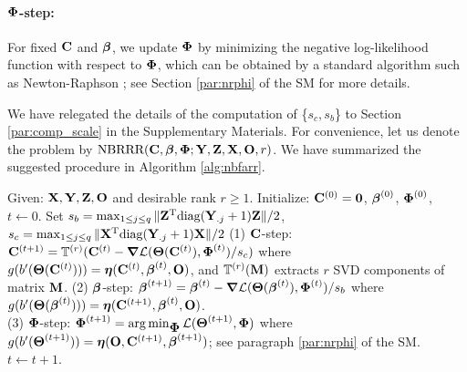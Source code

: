 \documentclass[12pt]{article}
\def\trans{^{\rm T}}
\newcommand{\bbL}{\mathcal{L}}
\newcommand{\bs}{\boldsymbol}
\newcommand{\cb}{\color{blue}}
\begin{document}
\paragraph{$\mbox{\boldmath $\Phi$}$-step:}\label{par:phi}
For fixed ${\bf C}$ and $\mbox{\boldmath $\beta$}$, we update $\mbox{\boldmath $\Phi$}$ by minimizing the negative log-likelihood function with respect to $\mbox{\boldmath $\Phi$}$, which can be obtained by a standard algorithm such as Newton-Raphson \citep{citer2019}; see Section \ref{par:nrphi} of the SM for more details. 


We have relegated the details of the  computation of \{$s_c,s_b$\} to Section \ref{par:comp_scale} in the Supplementary Materials.   
For convenience, let us denote the problem by $\mbox{NBRRR}({\bf C},\mbox{\boldmath $\beta$},\mbox{\boldmath $\Phi$}; {\bf Y}, {\bf Z}, {\bf X},{\bf O},r)$. We have summarized the suggested procedure in  Algorithm \ref{alg:nbfarr}. 


\begin{algorithm}[!]
	\caption{$\M{NBRRR}(\C,\bbeta,\bPhi; \W, \Z,\X,\bO,r)$}
	\begin{algorithmic}\label{alg:nbfarr}
	\STATE Given: ${\bf X}, {\bf Y}, {\bf Z}, {\bf O}$ and desirable rank $r\geq 1$.
	\STATE Initialize: ${\bf C}^{(0)} = {\bf 0}$, $\mbox{\boldmath $\beta$}^{(0)}$, $\mbox{\boldmath $\Phi$}^{(0)}$, $t \gets 0$. 
\STATE Set $s_b= \max_{1\leq j \leq q}  \|\Z\trans\M{diag}(\Y_{.j}+1)\Z \|/2$, $s_c = \max_{1\leq j \leq q}  \|\X\trans\M{diag}(\Y_{.j}+1)\X \|/2$ 
		\REPEAT 
		\vspace{0.1cm}
		\STATE (1) $\mbox{\bf C}$-step: $\C^{(t+1)} = \mathbb{T}^{(r)} (\C^{(t)} -  \bs\nabla \bbL(\bs\Theta(\C^{(t)} ),\bPhi^{(t)} )/s_c )$ where $g(b'(\bs\Theta(\C^{(t)}))) = \bs\eta(\C^{(t)},\bbeta^{(t)}, \bO)$, and $\mathbb{T}^{(r)}(\mbox{\bf M})$ extracts  $r$ SVD components of matrix $\mbox{\bf M}$. 
		\vspace{0.1cm}
		\STATE (2) $\mbox{\boldmath $\beta$}$-step:
		$\bbeta^{(t+1)} =  \bbeta^{(t)}  - \bs\nabla \bbL(\bs\Theta(\bbeta^{(t)} ), \bPhi^{(t)} )/s_b$ where $g(b'(\bs\Theta(\bbeta^{(t)}))) = \bs\eta(\C^{(t+1)},\bbeta^{(t)}, \bO)$. \\
		\vspace{0.1cm}
		\STATE (3) $\mbox{\boldmath $\Phi$}$-step: $\bPhi^{(t+1)} = \arg\min_{\bPhi} \bbL(\bs\Theta^{(t+1)},\bPhi)$ where $g(b'(\bs\Theta^{(t+1)}))= \bs\eta(\bO, \C^{(t+1)},\bbeta^{(t+1)})$; see paragraph \ref{par:nrphi}  of the SM. 
		\vspace{0.2cm}
		\STATE $t\gets t+1$.
	\end{algorithmic}
\end{algorithm}
\end{document}
